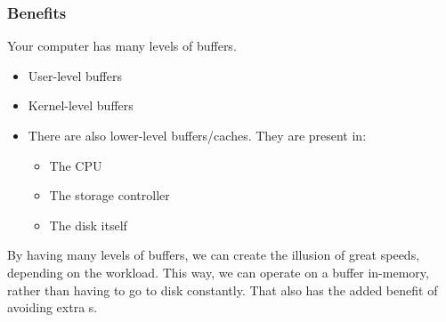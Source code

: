\subsubsection{Benefits}\label{subsubsec:Buffering_Benefits}
Your computer has many levels of buffers.
\begin{itemize}[noitemsep]
\item User-level buffers
\item Kernel-level buffers
\item There are also lower-level buffers/caches. They are present in:
  \begin{itemize}[noitemsep]
  \item The CPU
  \item The storage controller
  \item The disk itself
  \end{itemize}
\end{itemize}

By having many levels of buffers, we can create the illusion of great speeds, depending on the workload.
This way, we can operate on a buffer in-memory, rather than having to go to disk constantly.
That also has the added benefit of avoiding extra s.

